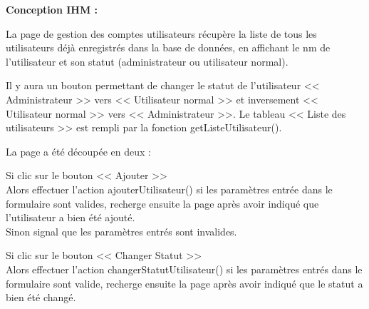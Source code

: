 			\begin{paragraphe}
				\textbf{Conception IHM :}
			\end{paragraphe}

			\begin{paragraphe}
				La page de gestion des comptes utilisateurs récupère la liste de tous les utilisateurs déjà enregistrés dans la base de données, en affichant le nm de l'utilisateur et son statut (administrateur ou utilisateur normal).
			\end{paragraphe}

			\begin{paragraphe}
				Il y aura un bouton permettant de changer le statut de l'utilisateur << Administrateur >> vers << Utilisateur normal >> et inversement << Utilisateur normal >> vers << Administrateur >>. Le tableau << Liste des utilisateurs >> est rempli par la fonction getListeUtilisateur().
			\end{paragraphe}


			\begin{paragraphe}
				La page a été découpée en deux :
			\end{paragraphe}

			\begin{paragraphe}
				Si clic sur le bouton << Ajouter >> \\
				Alors effectuer l'action ajouterUtilisateur() si les paramètres entrée dans le formulaire sont valides, recherge ensuite la page après avoir indiqué que l'utilisateur a bien été ajouté. \\
				Sinon signal que les paramètres entrés sont invalides.
			\end{paragraphe}

			\begin{paragraphe}
				Si clic sur le bouton << Changer Statut >> \\
				Alors effectuer l'action changerStatutUtilisateur() si les paramètres entrés dans le formulaire sont valide, recherge ensuite la page après avoir indiqué que le statut a bien été changé.
			\end{paragraphe}

